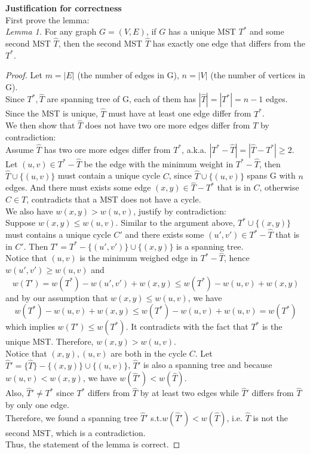 \documentclass[11pt]{article}
\begin{document}
\begin{enumerate}
\textbf{Justification for correctness}\\[2ex]
First prove the lemma:\\
\textit{Lemma 1. } For any graph $G=(V,E)$, if $G$ has a unique MST $T^*$ and some second MST $\hat{T}$, then the second MST $\hat{T}$ has exactly one edge that differs from the $T^*$. 
\begin{proof} 
    Let $m = |E|$ (the number of edges in G), $n = |V|$ (the number of vertices in G). \\
    Since $T^*, \hat{T}$ are spanning tree of G, each of them has $|\hat{T}|=|T^*| = n-1$ edges. \\[2ex]
    Since the MST is unique, $\hat{T}$ must have at least one edge differ from $T^*$. \\
    We then show that $\hat{T}$ does not have two ore more edges differ from $T$ by contradiction: \\[2ex]
    Assume $\hat{T}$ has two ore more edges differ from $T^*$, a.k.a. $|T^*-\hat{T}|=|\hat{T}-T^*|\geq 2$. \\[2ex]
    Let $(u,v)\in T^*-\hat{T}$ be the edge with the minimum weight in $T^*-\hat{T}$, then $\hat{T}\cup\{(u,v)\}$ must contain a unique cycle $C$, since $\hat{T}\cup\{(u,v)\}$ spans G with $n$ edges. And there must exists some edge $(x,y)\in \hat{T}-T^*$ that is in $C$,  otherwise $C \in T$, contradicts that a MST does not have a cycle. \\[2ex]
    We also have $w(x,y)>w(u,v)$, justify by contradiction: \\
    Suppose $w(x,y)\leq w(u,v)$. Similar to the argument above, $T^*\cup\{(x,y)\}$ must contains a unique cycle $C'$ and there exists some $(u',v')\in T^*-\hat{T}$ that is in $C'$. Then $T'=T^*-\{(u',v')\}\cup\{(x,y)\}$ is a spanning tree.\\ Notice that $(u,v)$ is the minimum weighed edge in $T^*-\hat{T}$, hence $w(u',v')\geq w(u,v)$ and 
    $$w(T') = w(T^*)-w(u',v')+w(x,y) \leq w(T^*) - w(u,v)+w(x,y)$$
    and by our assumption that $w(x,y)\leq w(u,v)$, we have 
    $$w(T^*) - w(u,v)+w(x,y) \leq w(T^*) - w(u,v)+w(u,v) = w(T^*)$$
    which implies $w(T')\leq w(T^*)$. It contradicts with the fact that $T^*$ is the unique MST. Therefore, $w(x,y)>w(u,v)$.\\
    
    Notice that $(x,y),(u,v)$ are both in the cycle $C$. Let $\hat{T}'=\{ \hat T\}-\{(x,y)\}\cup\{(u,v)\}$, $\hat{T}'$ is also a spanning tree and because $w(u,v)<w(x,y)$, we have $w(\hat{T}')<w(\hat{T})$.\\
    Also, $\hat{T}'\neq T^*$ since $T^*$ differs from $\hat{T}$ by at least two edges while $\hat{T}'$ differs from $\hat{T}$ by only one edge. \\
    Therefore, we found a spanning tree $\hat{T}'$ s.t.$w(\hat{T}')<w(\hat{T})$, i.e. $\hat{T}$ is not the second MST, which is a contradiction.\\
    Thus, the statement of the lemma is correct.
\end{proof}


\end{enumerate}
\end{document}
